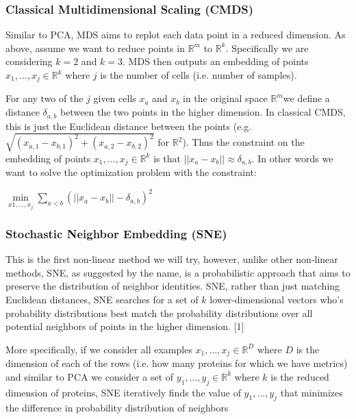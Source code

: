 \documentclass{article} %
\begin{document}
\subsubsection{Classical Multidimensional Scaling (CMDS)}
Similar to PCA, MDS aims to replot each data point in a reduced dimension. As above, assume we want to reduce points in {$\mathbb{R}^m$} to {$ \mathbb{R}^k $}. Specifically we are considering {$k=2$} and {$k=3$}. MDS then outputs an embedding of points {$x_1,\ldots,x_j \in \mathbb{R}^k $} where {$j$} is the number of cells (i.e. number of samples). 

For any two of the {$j$} given cells {$ x_a $} and {$x_b$} in the original space {$\mathbb{R}^m$}we define a distance {$\delta_{a,b} $} between the two points in the higher dimension. In classical CMDS, this is just the Euclidean distance between the points (e.g. {$\sqrt{(x_{a,1}-x_{b,1})^2 + (x_{a,2}-x_{b,2})^2}$} for {$\mathbb{R}^2$}). Thus the constraint on the embedding of points {$x_1,\ldots,x_j \in \mathbb{R}^k $} is that {$ || x_a -x_b||\approx \delta_{a,b} $}. In other words we want to solve the optimization problem with the constraint: 
\begin{center}
{$ \min\limits_{x1,\ldots,x_j} \sum_{a<b} (|| x_a -x_b|| - \delta_{a,b})^2 $}
\end{center}

\subsubsection{Stochastic Neighbor Embedding (SNE)}
This is the first non-linear method we will try, however, unlike other non-linear methods, SNE, as suggested by the name, is a probabilistic approach that aims to preserve the distribution of neighbor identities. SNE, rather than just matching Euclidean distances,  SNE searches for a set of {$ k $} lower-dimensional vectors who's probability distributions best match the probability distributions over all potential neighbors of points in the higher dimension. [1]

More specifically, if we consider all examples {$ x_1,\ldots,x_j \in \mathbb{R}^D $} where {$ D $} is the dimension of each of the rows (i.e. how many proteins for which we have metrics) and similar to PCA we consider a set of {$ y_1,\ldots, y_j \in \mathbb{R}^k $} where {$ k $} is the reduced dimension of proteins, SNE iteratively finds the value of {$ y_1,\ldots,y_j $} that minimizes the difference in probability distribution of neighbors 
\end{document}
